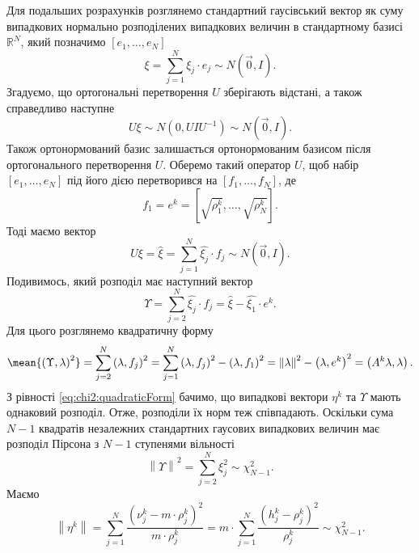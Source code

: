 Для подальших розрахунків розглянемо стандартний гаусівський вектор
як суму випадкових нормально розподілених випадкових величин в стандартному
базисі $\mathbb{R}^N$, який позначимо $\left[ e_1, \dots, e_N \right]$
\begin{equation*}
  \xi = \sum_{j=1}^{N}\xi_j \cdot e_j \sim N\left( \vec{0}, I \right).
\end{equation*}
Згадуємо, що ортогональні перетворення $U$ зберігають відстані, а також
справедливо наступне
\begin{equation*}
  U\xi \sim N\left( 0, U I U^{-1} \right) \sim N\left( \vec{0}, I \right).
\end{equation*}
Також ортонормований базис залишається ортонормованим базисом після
ортогонального перетворення $U$.
Оберемо такий оператор $U$, щоб набір $\left[ e_1, \dots, e_N \right]$ під його
дією перетворився на $\left[ f_1, \dots, f_N \right]$, де
\begin{equation*}
  f_1 = e^k = \left[ \sqrt{\rho_1^k}, \dots, \sqrt{\rho_N^k} \right].
\end{equation*}
Тоді маємо вектор
\begin{equation*}
  U\xi
  = \hat{\xi}
  = \sum_{j=1}^{N} \hat{\xi_j} \cdot f_j \sim N\left( \vec{0}, I \right).
\end{equation*}
Подивимось, який розподіл має наступний вектор
\begin{equation*}
  \Upsilon
  = \sum_{j=2}^{N} \hat{\xi_j} \cdot f_j
  = \hat{\xi} - \hat{\xi_1} \cdot e^k.
\end{equation*}
Для цього розглянемо квадратичну форму
\begin{equation*}
  \mean{\left( \Upsilon, \lambda \right)^2}
  = \sum_{j=2}^{N} \left( \lambda, f_j \right)^2
  = \sum_{j=1}^{N} \left( \lambda, f_j \right)^2 - \left( \lambda, f_1 \right)^2
  = \left\| \lambda \right\|^2 - \left( \lambda, e^k \right)^2
  = \left( A^k \lambda, \lambda \right).
\end{equation*}
З рівності \eqref{eq:chi2:quadraticForm} бачимо, що випадкові вектори $\eta^k$
та $\Upsilon$ мають однаковий розподіл.
Отже, розподіли їх норм теж співпадають.
Оскільки сума $N-1$ квадратів незалежних стандартних гаусових випадкових
величин має розподіл Пірсона з $N-1$ ступенями вільності
\begin{equation*}
  \left\| \Upsilon \right\|^2 = \sum_{j=2}^{N} \xi_j^2 \sim \chi_{N-1}^2.
\end{equation*}
Маємо
\begin{equation*}
  \left\| \eta^k \right\|
  = \sum_{j=1}^{N}\frac{\left( \nu_j^k - m \cdot \rho_j^k \right)^2}{
    m \cdot \rho_j^k}
  = m \cdot \sum_{j=1}^{N}\frac{\left( h_j^k - \rho_j^k \right)^2}{\rho_j^k}
  \sim \chi_{N-1}^2.
\end{equation*}


